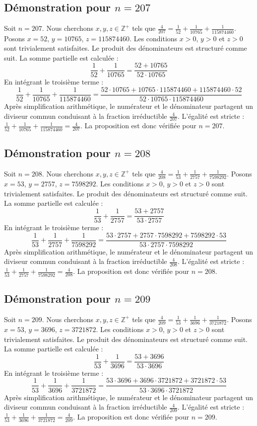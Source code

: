 \documentclass[11pt,a4paper]{article}
\begin{document}
\subsection{Démonstration pour $n = 207$}
Soit $n = 207$. Nous cherchons $x, y, z \in \mathbb{Z}^{+}$ tels que $\frac{4}{207} = \frac{1}{52} + \frac{1}{10765} + \frac{1}{115874460}$.
Posons $x = 52$, $y = 10765$, $z = 115874460$.
Les conditions $x > 0$, $y > 0$ et $z > 0$ sont trivialement satisfaites.
Le produit des dénominateurs est structuré comme suit. La somme partielle est calculée :
$$ \frac{1}{52} + \frac{1}{10765} = \frac{52+10765}{52 \cdot 10765} $$
En intégrant le troisième terme :
$$ \frac{1}{52} + \frac{1}{10765} + \frac{1}{115874460} = \frac{52 \cdot 10765 + 10765 \cdot 115874460 + 115874460 \cdot 52}{52 \cdot 10765 \cdot 115874460} $$
Après simplification arithmétique, le numérateur et le dénominateur partagent un diviseur commun conduisant à la fraction irréductible $\frac{4}{207}$.
L'égalité est stricte : $\frac{1}{52} + \frac{1}{10765} + \frac{1}{115874460} = \frac{4}{207}$.
La proposition est donc vérifiée pour $n = 207$.
\subsection{Démonstration pour $n = 208$}
Soit $n = 208$. Nous cherchons $x, y, z \in \mathbb{Z}^{+}$ tels que $\frac{4}{208} = \frac{1}{53} + \frac{1}{2757} + \frac{1}{7598292}$.
Posons $x = 53$, $y = 2757$, $z = 7598292$.
Les conditions $x > 0$, $y > 0$ et $z > 0$ sont trivialement satisfaites.
Le produit des dénominateurs est structuré comme suit. La somme partielle est calculée :
$$ \frac{1}{53} + \frac{1}{2757} = \frac{53+2757}{53 \cdot 2757} $$
En intégrant le troisième terme :
$$ \frac{1}{53} + \frac{1}{2757} + \frac{1}{7598292} = \frac{53 \cdot 2757 + 2757 \cdot 7598292 + 7598292 \cdot 53}{53 \cdot 2757 \cdot 7598292} $$
Après simplification arithmétique, le numérateur et le dénominateur partagent un diviseur commun conduisant à la fraction irréductible $\frac{4}{208}$.
L'égalité est stricte : $\frac{1}{53} + \frac{1}{2757} + \frac{1}{7598292} = \frac{4}{208}$.
La proposition est donc vérifiée pour $n = 208$.
\subsection{Démonstration pour $n = 209$}
Soit $n = 209$. Nous cherchons $x, y, z \in \mathbb{Z}^{+}$ tels que $\frac{4}{209} = \frac{1}{53} + \frac{1}{3696} + \frac{1}{3721872}$.
Posons $x = 53$, $y = 3696$, $z = 3721872$.
Les conditions $x > 0$, $y > 0$ et $z > 0$ sont trivialement satisfaites.
Le produit des dénominateurs est structuré comme suit. La somme partielle est calculée :
$$ \frac{1}{53} + \frac{1}{3696} = \frac{53+3696}{53 \cdot 3696} $$
En intégrant le troisième terme :
$$ \frac{1}{53} + \frac{1}{3696} + \frac{1}{3721872} = \frac{53 \cdot 3696 + 3696 \cdot 3721872 + 3721872 \cdot 53}{53 \cdot 3696 \cdot 3721872} $$
Après simplification arithmétique, le numérateur et le dénominateur partagent un diviseur commun conduisant à la fraction irréductible $\frac{4}{209}$.
L'égalité est stricte : $\frac{1}{53} + \frac{1}{3696} + \frac{1}{3721872} = \frac{4}{209}$.
La proposition est donc vérifiée pour $n = 209$.
\end{document}
